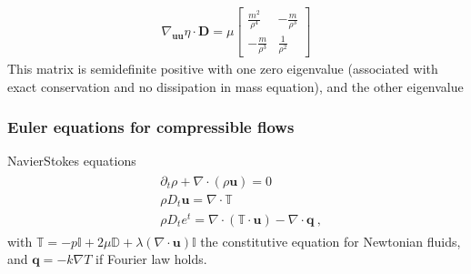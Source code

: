\documentclass[letterpaper,10pt,english]{jupyterBook}
\begin{document}
\sphinxAtStartPar
{}
\begin{equation*}
\begin{split}
\nabla_{\mathbf{u} \mathbf{u}} \eta \cdot \mathbf{D} = 
\mu \begin{bmatrix} \frac{m^2}{\rho^4} & -\frac{m}{\rho^3} \\ - \frac{m}{\rho^3} & \frac{1}{\rho^2} \end{bmatrix}
\end{split}
\end{equation*}
\sphinxAtStartPar
This matrix is semi\sphinxhyphen{}definite positive with one zero eigenvalue (associated with exact conservation and no dissipation in mass equation), and the other eigenvalue
\subsubsection*{Euler equations for compressible flows}

\sphinxAtStartPar
Navier\sphinxhyphen{}Stokes equations
\begin{equation*}
\begin{split}\begin{aligned}
  & \partial_t \rho + \nabla \cdot ( \rho \mathbf{u} ) = 0 \\
  & \rho D_t \mathbf{u} = \nabla \cdot \mathbb{T} \\
  & \rho D_t e^t = \nabla \cdot ( \mathbb{T} \cdot \mathbf{u} ) - \nabla \cdot \mathbf{q} \ ,
\end{aligned}\end{split}
\end{equation*}
\sphinxAtStartPar
with \(\mathbb{T} = -p \mathbb{I} + 2  \mu \mathbb{D} + \lambda ( \nabla \cdot \mathbf{u} ) \mathbb{I}\) the constitutive equation for Newtonian fluids, and \(\mathbf{q} = - k \nabla T\) if Fourier law holds.
\end{document}
